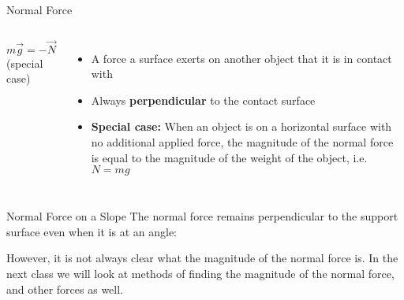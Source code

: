 \documentclass[12pt,compress,aspectratio=169]{beamer}
\begin{document}
\begin{frame}{Normal Force}
  \begin{columns}
    \centering
    
    $m\vec g=-\vec N$\\(special case)
    
    \begin{itemize}
    \item A force a surface exerts on another object that it is in contact with
    \item Always \textbf{perpendicular} to the contact surface
    \item\textbf{Special case:} When an object is on a horizontal surface
      with no additional applied force, the magnitude of the normal force is
      equal to the magnitude of the weight of the object, i.e.\ $N=mg$
    \end{itemize}
  \end{columns}
\end{frame}



\begin{frame}{Normal Force on a Slope}
  The normal force remains perpendicular to the support surface even when it is
  at an angle:
  \begin{center}
  \end{center}
  However, it is not always clear what the magnitude of the normal force is.
  In the next class we will look at methods of finding the magnitude of the
  normal force, and other forces as well.
\end{frame}
\end{document}
